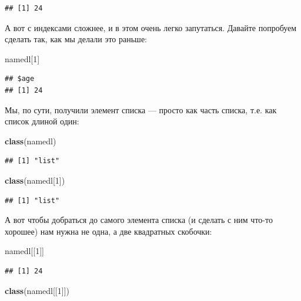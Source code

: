 \documentclass[]{book}
\newenvironment{Shaded}{\begin{snugshade}}{\end{snugshade}}
\newcommand{\KeywordTok}[1]{\textcolor[rgb]{0.13,0.29,0.53}{\textbf{#1}}}
\newcommand{\DecValTok}[1]{\textcolor[rgb]{0.00,0.00,0.81}{#1}}
\newcommand{\NormalTok}[1]{#1}
\begin{document}
\begin{verbatim}
## [1] 24
\end{verbatim}

А вот с индексами сложнее, и в этом очень легко запутаться. Давайте
попробуем сделать так, как мы делали это раньше:

\begin{Shaded}
\begin{Highlighting}[]
\NormalTok{namedl[}\DecValTok{1}\NormalTok{]}
\end{Highlighting}
\end{Shaded}

\begin{verbatim}
## $age
## [1] 24
\end{verbatim}

Мы, по сути, получили элемент списка --- просто как часть списка, т.е.
как список длиной один:

\begin{Shaded}
\begin{Highlighting}[]
\KeywordTok{class}\NormalTok{(namedl)}
\end{Highlighting}
\end{Shaded}

\begin{verbatim}
## [1] "list"
\end{verbatim}

\begin{Shaded}
\begin{Highlighting}[]
\KeywordTok{class}\NormalTok{(namedl[}\DecValTok{1}\NormalTok{])}
\end{Highlighting}
\end{Shaded}

\begin{verbatim}
## [1] "list"
\end{verbatim}

А вот чтобы добраться до самого элемента списка (и сделать с ним что-то
хорошее) нам нужна не одна, а две квадратных скобочки:

\begin{Shaded}
\begin{Highlighting}[]
\NormalTok{namedl[[}\DecValTok{1}\NormalTok{]]}
\end{Highlighting}
\end{Shaded}

\begin{verbatim}
## [1] 24
\end{verbatim}

\begin{Shaded}
\begin{Highlighting}[]
\KeywordTok{class}\NormalTok{(namedl[[}\DecValTok{1}\NormalTok{]])}
\end{Highlighting}
\end{Shaded}
\end{document}
